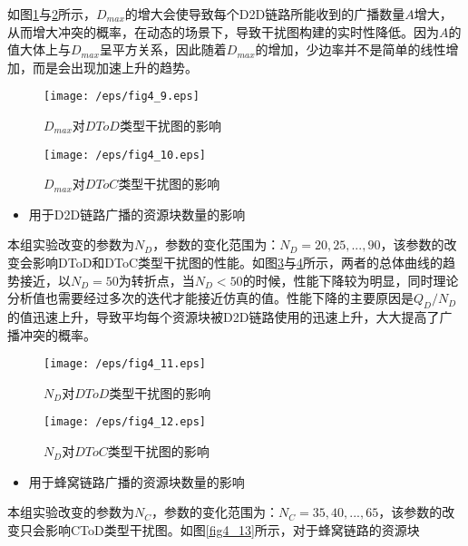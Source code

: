 \documentclass[figurelist,tablelist,algorithmlist,nomlist,masters]{seuthesix}
\begin{document}
	如图\ref{fig4_9}与\ref{fig4_10}所示，$D_{max}$的增大会使导致每个D2D链路所能收到的广播数量$A$增大，从而增大冲突的概率，在动态的场景下，导致干扰图构建的实时性降低。因为$A$的值大体上与$D_{max}$呈平方关系，因此随着$D_{max}$的增加，少边率并不是简单的线性增加，而是会出现加速上升的趋势。

	\begin{figure}[!h]
		\centering
		\texttt{[image: /eps/fig4\_9.eps]}
		\caption{$D_{max}$对$DToD$类型干扰图的影响}
		\label{fig4_9}
	\end{figure}

	\begin{figure}[!h]
		\centering
		\texttt{[image: /eps/fig4\_10.eps]}
		\caption{$D_{max}$对$DToC$类型干扰图的影响}
		\label{fig4_10}
	\end{figure}
	
	
	\begin{itemize}
		\item 用于D2D链路广播的资源块数量的影响
	\end{itemize}
	
	本组实验改变的参数为$N_{D}$，参数的变化范围为：$N_{D} = 20,25,...,90$，该参数的改变会影响DToD和DToC类型干扰图的性能。如图\ref{fig4_11}与\ref{fig4_12}所示，两者的总体曲线的趋势接近，以$N_{D} = 50$为转折点，当$N_{D} < 50$的时候，性能下降较为明显，同时理论分析值也需要经过多次的迭代才能接近仿真的值。性能下降的主要原因是$Q_{D} / N_{D}$的值迅速上升，导致平均每个资源块被D2D链路使用的迅速上升，大大提高了广播冲突的概率。

	\begin{figure}[!h]
		\centering
		\texttt{[image: /eps/fig4\_11.eps]}
		\caption{$N_D$对$DToD$类型干扰图的影响}
		\label{fig4_11}
	\end{figure}

	\begin{figure}[!h]
		\centering
		\texttt{[image: /eps/fig4\_12.eps]}
		\caption{$N_D$对$DToC$类型干扰图的影响}
		\label{fig4_12}
	\end{figure}

	\begin{itemize}
	\item 用于蜂窝链路广播的资源块数量的影响
	\end{itemize}
	
	本组实验改变的参数为$N_{C}$，参数的变化范围为：$N_{C} = 35,40,...,65$，该参数的改变只会影响CToD类型干扰图。如图\ref{fig4_13}所示，对于蜂窝链路的资源块
	
\end{document}
